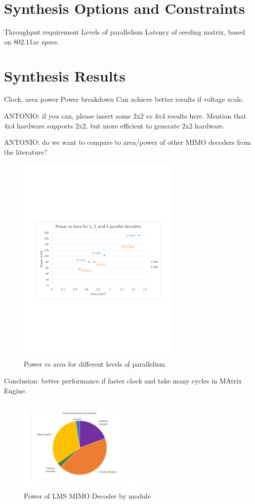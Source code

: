 \documentclass[journal]{IEEEtran}
\begin{document}
\section{Synthesis Options and Constraints}

Throughput requirement
Levels of parallelism
Latency of seeding matrix, based on 802.11ac specs.


\section{Synthesis Results}

Clock, area power
Power breakdown
Can achieve better results if voltage scale.

ANTONIO: if you can, please insert some 2x2 vs 4x4 results here. Mention that 4x4 hardware supports 2x2, but more efficient to generate 2x2 hardware.

ANTONIO: do we want to compare to area/power of other MIMO decoders from the literature?

\begin{figure}[!h]
\centering
\includegraphics*[width=8cm, viewport = 60 250 560 540]{images/power_vs_area.pdf}
\caption{Power vs area for different levels of parallelism}
\label{power_vs_area}
\end{figure}

Conclusion: better performance if faster clock and take many cycles in MAtrix Engine.

\begin{figure}[!h]
\centering
\includegraphics*[width=6cm, viewport = 90 100 660 540]{images/power_breakdown_module.pdf}
\caption{Power of LMS MIMO Decoder by module}
\label{power_breakdown_module}
\end{figure}
\end{document}
